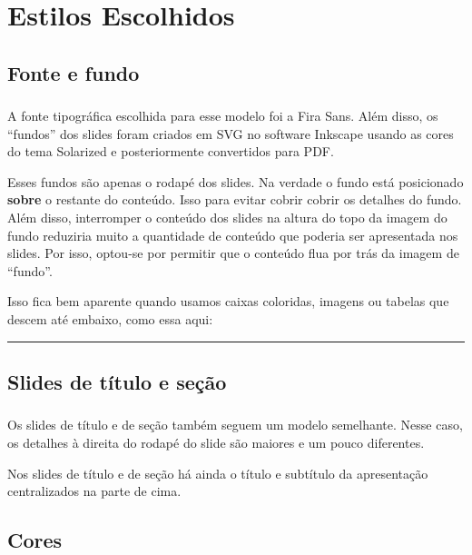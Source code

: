 \documentclass[aspectratio=169]{beamer}
\begin{document}
\section{Estilos Escolhidos}

\subsection{Fonte e fundo}

\begin{frame}[t]\frametitle{\secname}\framesubtitle{\subsecname}
  A fonte tipográfica escolhida para esse modelo foi a Fira Sans.
  Além disso, os ``fundos'' dos slides foram criados em SVG no software Inkscape usando as cores do tema Solarized e posteriormente convertidos para PDF.

  Esses fundos são apenas o rodapé dos slides.
  Na verdade o fundo está posicionado \textbf{sobre} o restante do conteúdo.
  Isso para evitar cobrir cobrir os detalhes do fundo. Além disso,
  interromper o conteúdo dos slides na altura do topo da imagem do fundo reduziria muito a quantidade de conteúdo que poderia ser apresentada nos slides.
  Por isso, optou-se por permitir que o conteúdo flua por trás da imagem de ``fundo''.
  
  Isso fica bem aparente quando usamos caixas coloridas, imagens ou tabelas que descem até embaixo, como essa aqui:

  \color{red}\rule{\textwidth}{0.5cm}
\end{frame}

\subsection{Slides de título e seção}

\begin{frame}[t]\frametitle{\secname}\framesubtitle{\subsecname}
  Os slides de título e de seção também seguem um modelo semelhante.
  Nesse caso, os detalhes à direita do rodapé do slide são maiores e um pouco diferentes.

  Nos slides de título e de seção há ainda o título e subtítulo da apresentação centralizados na parte de cima.
\end{frame}

\subsection{Cores}
\end{document}
